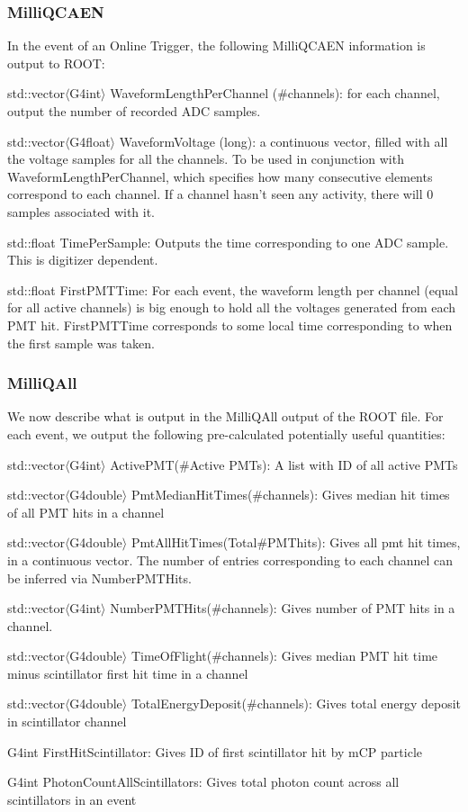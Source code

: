 \documentclass[prd,noshowpacs,nofootinbib,amsmath,amssymb,superscriptaddress]{revtex4}
\begin{document}
\subsubsection{MilliQCAEN}
In the event of an Online Trigger, the following MilliQCAEN information is output to ROOT: 
\bi
\item  std::vector$\langle$G4int$\rangle$ WaveformLengthPerChannel (\#channels): for each channel, output the number of recorded ADC samples.
\item  std::vector$\langle$G4float$\rangle$ WaveformVoltage (long): a continuous vector, filled with all the voltage samples for all the channels. To be used in conjunction with WaveformLengthPerChannel, which specifies how many consecutive elements correspond to each channel. If a channel hasn't seen any activity, there will 0 samples associated with it. 
\item std::float TimePerSample: Outputs the time corresponding to one ADC sample. This is digitizer dependent. 
\item std::float FirstPMTTime: For each event, the waveform length per channel (equal for all active channels) is big enough to hold all the voltages generated from each PMT hit. FirstPMTTime corresponds to some local time corresponding to when the first sample was taken. 
\ei
%
%
\subsubsection{MilliQAll}
We now describe what is output in the MilliQAll output of the ROOT file. For each event, we output the following pre-calculated potentially useful quantities:
%
\bi
\item std::vector$\langle$G4int$\rangle$ ActivePMT(\#Active PMTs):  A list with ID of all active PMTs 
\item std::vector$\langle$G4double$\rangle$ PmtMedianHitTimes(\#channels): Gives median hit times of all PMT hits in a channel
\item std::vector$\langle$G4double$\rangle$ PmtAllHitTimes(Total\#PMThits): Gives all pmt hit times, in a continuous vector. The number of entries corresponding to each channel can be inferred via NumberPMTHits.
\item std::vector$\langle$G4int$\rangle$ NumberPMTHits(\#channels): Gives number of PMT hits in a channel.   
\item std::vector$\langle$G4double$\rangle$ TimeOfFlight(\#channels): Gives median PMT hit time minus scintillator first hit time in a channel
\item std::vector$\langle$G4double$\rangle$ TotalEnergyDeposit(\#channels): Gives total energy deposit in scintillator channel 
\item G4int FirstHitScintillator: Gives ID of first scintillator hit by mCP particle 
\item G4int PhotonCountAllScintillators: Gives total photon count across all scintillators in an event
\ei
\end{document}
